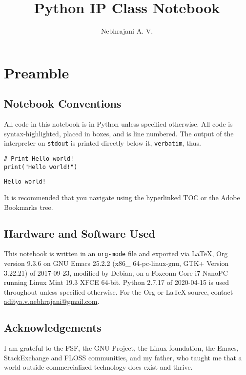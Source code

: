 \documentclass[11pt]{article}
\author{Nebhrajani A. V.}
\date{}
\title{Python IP Class Notebook}
\begin{document}
\maketitle
\tableofcontents

\newpage

\section{Preamble}
\label{sec:org81c9823}
\subsection{Notebook Conventions}
\label{sec:orgb595508}
All code in this notebook is in Python unless specified otherwise.
All code is syntax-highlighted, placed in boxes, and is line
numbered. The output of the interpreter on \texttt{stdout} is printed directly below it,
\texttt{verbatim}, thus.
\begin{verbatim}
# Print Hello world!
print("Hello world!")
\end{verbatim}

\begin{verbatim}
Hello world!
\end{verbatim}


It is recommended that you navigate using the hyperlinked TOC or the Adobe
Bookmarks tree.

\subsection{Hardware and Software Used}
\label{sec:org2e82900}

 This notebook is written in an \texttt{org-mode} file and exported via \LaTeX{}, Org version 9.3.6 on
GNU Emacs 25.2.2 (x86\_ 64-pc-linux-gnu, GTK+ Version 3.22.21) of
2017-09-23, modified by Debian, on a Foxconn Core i7 NanoPC running Linux
Mint 19.3 XFCE 64-bit. Python 2.7.17 of 2020-04-15 is used
throughout unless specified otherwise. For the Org or \LaTeX{} source, contact
\href{mailto:aditya.v.nebhrajani@gmail.com}{aditya.v.nebhrajani@gmail.com}.

\subsection{Acknowledgements}
\label{sec:orge1fd5ad}
I am grateful to the FSF, the GNU Project, the Linux foundation,
the Emacs, StackExchange and FLOSS communities, and my father,
who taught me that a world outside commercialized technology does
exist and thrive.
\newpage
\end{document}
